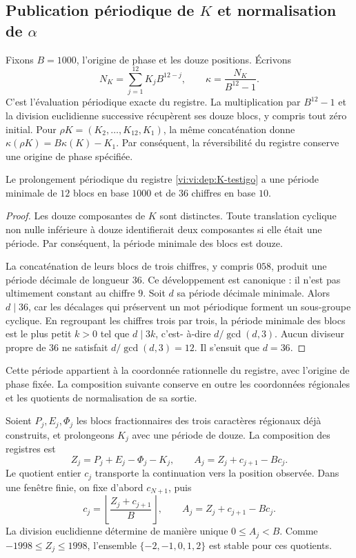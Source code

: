 \subsection{\texorpdfstring{Publication périodique de \(K\) et normalisation de \(\alpha\)}{Publication périodique de K et normalisation d'alpha}}
\label{vi:vi:dep:alpha}

Fixons \(B=1000\), l’origine de phase et les douze positions. Écrivons
\[
 N_K=\sum_{j=1}^{12}K_jB^{12-j},\qquad
 \kappa=\frac{N_K}{B^{12}-1}.
\]
C’est l’évaluation périodique exacte du registre. La multiplication
par \(B^{12}-1\) et la division euclidienne successive récupèrent ses douze
blocs, y compris tout zéro initial. Pour
\(\rho K=(K_2,\ldots,K_{12},K_1)\), la même concaténation donne
\(\kappa(\rho K)=B\kappa(K)-K_1\). Par conséquent, la réversibilité
du registre conserve une origine de phase spécifiée.

\begin{proposition}
\label{vi:vi:dep:periodo-minimo-k}
Le prolongement périodique du registre \eqref{vi:vi:dep:K-testigo}
a une période minimale de \(12\) blocs en base \(1000\) et de
\(36\) chiffres en base \(10\).
\end{proposition}
\begin{proof}
Les douze composantes de \(K\) sont distinctes. Toute translation
cyclique non nulle inférieure à douze identifierait deux composantes si elle était
une période. Par conséquent, la période minimale des blocs est douze.

La concaténation de leurs blocs de trois chiffres, y compris \(058\),
produit une période décimale de longueur \(36\). Ce développement est
canonique : il n’est pas ultimement constant au chiffre \(9\).
Soit \(d\) sa période décimale minimale. Alors \(d\mid36\),
car les décalages qui préservent un mot périodique forment
un sous-groupe cyclique. En regroupant les chiffres trois par trois, la période
minimale des blocs est le plus petit \(k>0\) tel que \(d\mid3k\), c’est-
à-dire \(d/\gcd(d,3)\). Aucun diviseur propre de \(36\)
ne satisfait \(d/\gcd(d,3)=12\). Il s’ensuit que \(d=36\).
\end{proof}

Cette période appartient à la coordonnée rationnelle du registre, avec
l’origine de phase fixée. La composition suivante conserve en outre les
coordonnées régionales et les quotients de normalisation de sa sortie.

Soient \(P_j,E_j,\Phi_j\) les blocs fractionnaires des trois
caractères régionaux déjà construits, et prolongeons \(K_j\) avec une période de
douze. La composition des registres est
\begin{equation}
 Z_j=P_j+E_j-\Phi_j-K_j,
 \qquad
 A_j=Z_j+c_{j+1}-Bc_j.
 \label{vi:vi:dep:normalizacion-alpha}
\end{equation}
Le quotient entier \(c_j\) transporte la continuation vers la position
observée. Dans une fenêtre finie, on fixe d’abord \(c_{N+1}\), puis
\[
 c_j=\left\lfloor\frac{Z_j+c_{j+1}}B\right\rfloor,
 \qquad A_j=Z_j+c_{j+1}-Bc_j.
\]
La division euclidienne détermine de manière unique \(0\le A_j<B\).
Comme \(-1998\le Z_j\le1998\), l’ensemble
\(\{-2,-1,0,1,2\}\) est stable pour ces quotients.

